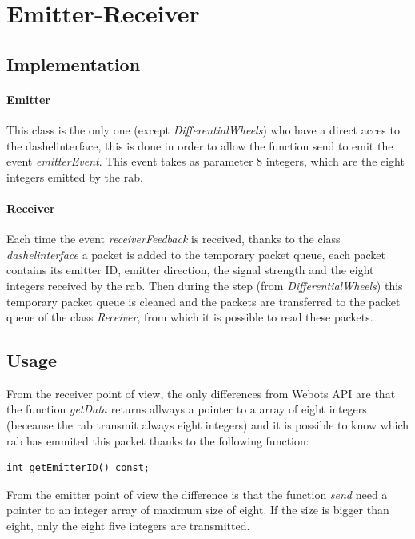\documentclass[a4paper,11pt]{report}
\begin{document}
\newpage
\section{Emitter-Receiver}
\subsection{Implementation}
\paragraph{Emitter} This class is the only one (except \textit{DifferentialWheels}) who have a direct acces to the dashelinterface, this is done in order to allow the function send to emit the event \textit{emitterEvent}. This event takes as parameter 8 integers, which are the eight integers emitted by the rab.\\

\paragraph{Receiver} Each time the event \textit{receiverFeedback} is received, thanks to the class \textit{dashelinterface} a packet is added to the temporary packet queue, each packet contains its emitter ID, emitter direction, the signal strength and the eight integers received by the rab. Then during the step (from \textit{DifferentialWheels}) this temporary packet queue is cleaned and the packets are transferred to the packet queue of the class \textit{Receiver}, from which it is possible to read these packets.\\

\subsection{Usage}
From the receiver point of view, the only differences from Webots API are that the function \textit{getData} returns allways a pointer to a array of eight integers (beceause the rab transmit always eight integers) and it is possible to know which rab has emmited this packet thanks to the following function:
\lstset{language=c++} 
\lstset{commentstyle=\textit} 
\begin{lstlisting} 
int getEmitterID() const;
\end{lstlisting}

From the emitter point of view the difference is that the function \textit{send} need a pointer to an integer array of maximum size of eight. If the size is bigger than eight, only the eight five integers are transmitted.\\
\end{document}
